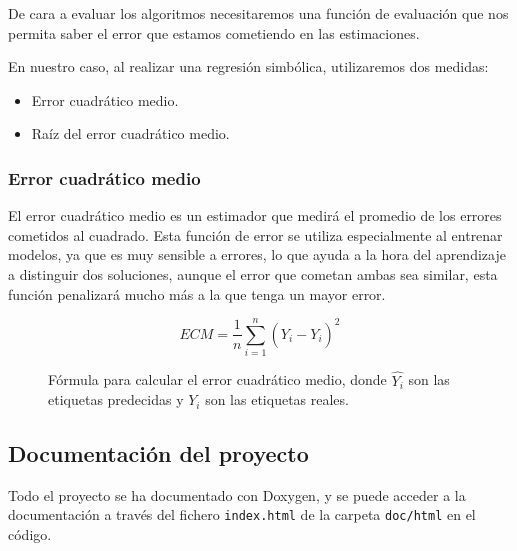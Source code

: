 De cara a evaluar los algoritmos necesitaremos una función de evaluación que nos permita saber el error que estamos cometiendo en las estimaciones.

En nuestro caso, al realizar una regresión simbólica, utilizaremos dos medidas:

\begin{itemize}
	\item Error cuadrático medio.
	\item Raíz del error cuadrático medio.
\end{itemize}

\subsubsection{Error cuadrático medio}

El error cuadrático medio es un estimador que medirá el promedio de los errores cometidos al cuadrado. Esta función de error se utiliza especialmente al entrenar modelos, ya que es muy sensible a errores, lo que ayuda a la hora del aprendizaje a distinguir dos soluciones, aunque el error que cometan ambas sea similar, esta función penalizará mucho más a la que tenga un mayor error.

\begin{figure}[H]
	 \centering
	 $$ ECM = \frac{1}{n} \sum_{i = 1}^{n}(\hat{Y_i} - Y_i)^2 $$
	 \caption{Fórmula para calcular el error cuadrático medio, donde $\hat{Y_i}$ son las etiquetas predecidas y $Y_i$ son las etiquetas reales.}
	\label{fig:ECM}
\end{figure}

%
%

\newpage

\subsection{Documentación del proyecto}

Todo el proyecto se ha documentado con Doxygen, y se puede acceder a la documentación a través del fichero \texttt{index.html} de la carpeta \texttt{doc/html} en el código.

